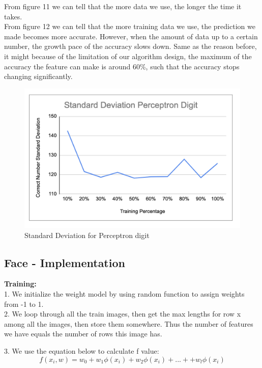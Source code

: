 \documentclass[11pt]{report}
\begin{document}
From figure 11 we can tell that the more data we use, the longer the time it takes.\\

From figure 12 we can tell that the more training data we use, the prediction we made becomes more accurate. However, when the amount of data up to a certain number, the growth pace of the accuracy slows down. Same as the reason before, it might because of the limitation of our algorithm design, the maximum of the accuracy the feature can make is around 60\%, such that the accuracy stops changing significantly. 

\begin{figure}[h]
\begin{center}
\includegraphics[scale=0.45]{Perceptron_digit_SD.png} 
\end{center}
\caption{Standard Deviation for Perceptron digit}
\end{figure}
\newpage

\subsection*{Face - Implementation}
\textbf{Training:} \\

1. We initialize the weight model by using random function to assign weights from -1 to 1. \\

2. We loop through all the train images, then get the max lengths for row x among all the images, then store them somewhere. Thus the number of features we have equals the number of rows this image has.

3. We use the equation below to calculate f value:
$$f(x_i, w) = w_0 + w_1\phi(x_i)+ w_2\phi(x_i) + ... + + w_l\phi(x_i)$$
\end{document}
